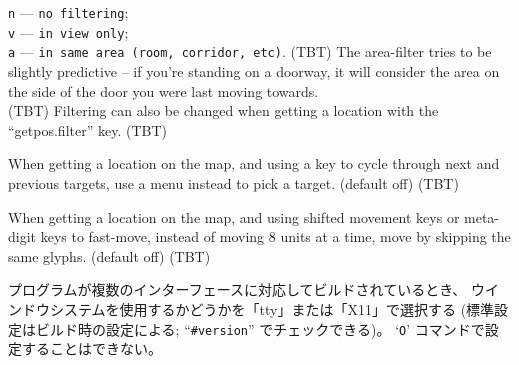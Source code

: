 {\tt n} --- \verb#no filtering#;\\
{\tt v} --- \verb#in view only#;\\
{\tt a} --- \verb#in same area (room, corridor, etc)#.
(TBT)
The area-filter tries to be slightly predictive -- if you're standing
on a doorway, it will consider the area on the side of the door you
were last moving towards.\\
(TBT)
Filtering can also be changed when getting a location with
the ``getpos.filter'' key.
(TBT)
\item[\ib{whatis\verb+_+menu}]
When getting a location on the map, and using a key to cycle through
next and previous targets, use a menu instead to pick a target.
(default off)
(TBT)
\item[\ib{whatis\verb+_+moveskip}]
When getting a location on the map, and using shifted movement keys or
meta-digit keys to fast-move, instead of moving 8 units at a time,
move by skipping the same glyphs.
(default off)
(TBT)
\item[\ib{windowtype}]
プログラムが複数のインターフェースに対応してビルドされているとき、
ウインドウシステムを使用するかどうかを「tty」または「X11」で選択する
(標準設定はビルド時の設定による; ``{\tt \#version}'' でチェックできる)。
`{\tt O}' コマンドで設定することはできない。

